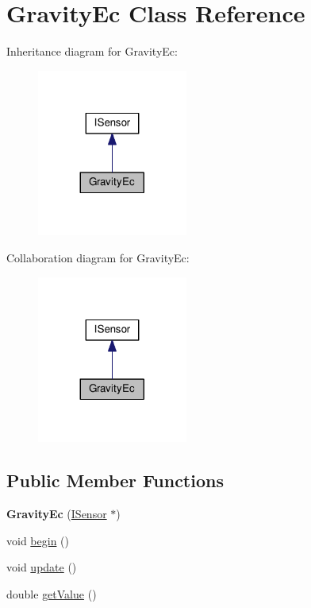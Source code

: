 \hypertarget{class_gravity_ec}{}\section{Gravity\+Ec Class Reference}
\label{class_gravity_ec}


Inheritance diagram for Gravity\+Ec\+:\nopagebreak
\begin{figure}[H]
\begin{center}
\leavevmode
\includegraphics[width=140pt]{class_gravity_ec__inherit__graph}
\end{center}
\end{figure}


Collaboration diagram for Gravity\+Ec\+:\nopagebreak
\begin{figure}[H]
\begin{center}
\leavevmode
\includegraphics[width=140pt]{class_gravity_ec__coll__graph}
\end{center}
\end{figure}
\subsection*{Public Member Functions}
\begin{DoxyCompactItemize}
\item 
{\bfseries Gravity\+Ec} (\hyperlink{class_i_sensor}{I\+Sensor} $\ast$)\hypertarget{class_gravity_ec_a6907e34720f011cf7eed6a99c93ab66f}{}\label{class_gravity_ec_a6907e34720f011cf7eed6a99c93ab66f}

\item 
void \hyperlink{class_gravity_ec_aab0f65470fdff7fb4465ecbbf57556a1}{begin} ()
\item 
void \hyperlink{class_gravity_ec_a8e0463b6147cfbcbc1488dd1614141c7}{update} ()
\item 
double \hyperlink{class_gravity_ec_ac7307196ab402c5a65cbc8beb9dd7399}{get\+Value} ()
\end{DoxyCompactItemize}

